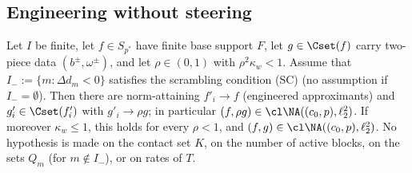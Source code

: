 
\subsection{Engineering without steering}

\begin{theorem}\label{thm:engineered}
Let $I$ be finite, let $f\in S_{p^*}$ have finite base support $F$, let
$g\in\Cset(f)$ carry two-piece data $(b^\pm,\omega^\pm)$, and let
$\rho\in(0,1)$ with $\rho^2\kappa_w<1$.  Assume that
$I_-:=\{m:\Delta d_m<0\}$ satisfies the scrambling condition \textup{(SC)}
\textup{(}no assumption if $I_-=\emptyset$\textup{)}.  Then there are
norm-attaining $f'_i\to f$ \textup{(}engineered approximants\textup{)} and
$g'_i\in\Cset(f'_i)$ with $g'_i\to\rho g$; in particular
$(f,\rho g)\in\cl\NA((c_0,p),\ell_2^2)$.  If moreover $\kappa_w\le1$, this
holds for every $\rho<1$, and $(f,g)\in\cl\NA((c_0,p),\ell_2^2)$.
No hypothesis is made on the contact set $K$, on the number of active
blocks, on the sets $Q_m$ \textup{(}for $m\notin I_-$\textup{)}, or on
rates of $T$.
\end{theorem}

